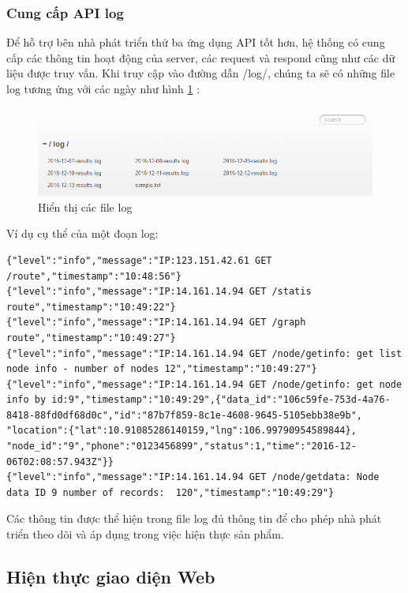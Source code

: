 \subsubsection*{Cung cấp API log}

Để hỗ trợ bên nhà phát triển thứ ba ứng dụng API tốt hơn, hệ thống có cung cấp các thông tin hoạt động của server, các request và respond cũng như các dữ liệu được truy vấn. Khi truy cập vào đường dẫn /log/, chúng ta sẽ có những file log tương ứng với các ngày như hình \ref{fig: log} :

\begin{figure}[H]
	\centering    
	\includegraphics[width=1.0\textwidth]{log}
	\caption[Hiển thị các file log]{Hiển thị các file log}
	\label{fig: log}
\end{figure}

Ví dụ cụ thể của một đoạn log:
\begin{lstlisting}
{"level":"info","message":"IP:123.151.42.61 GET /route","timestamp":"10:48:56"}
{"level":"info","message":"IP:14.161.14.94 GET /statis route","timestamp":"10:49:22"}
{"level":"info","message":"IP:14.161.14.94 GET /graph route","timestamp":"10:49:27"}
{"level":"info","message":"IP:14.161.14.94 GET /node/getinfo: get list node info - number of nodes 12","timestamp":"10:49:27"}
{"level":"info","message":"IP:14.161.14.94 GET /node/getinfo: get node info by id:9","timestamp":"10:49:29",{"data_id":"106c59fe-753d-4a76-8418-88fd0df68d0c","id":"87b7f859-8c1e-4608-9645-5105ebb38e9b", "location":{"lat":10.91085286140159,"lng":106.99790954589844}, "node_id":"9","phone":"0123456899","status":1,"time":"2016-12-06T02:08:57.943Z"}}
{"level":"info","message":"IP:14.161.14.94 GET /node/getdata: Node data ID 9 number of records:  120","timestamp":"10:49:29"}
\end{lstlisting}

Các thông tin được thể hiện trong file log đủ thông tin để cho phép nhà phát triển theo dõi và áp dụng trong việc hiện thực sản phẩm.

\subsection{Hiện thực giao diện Web}

